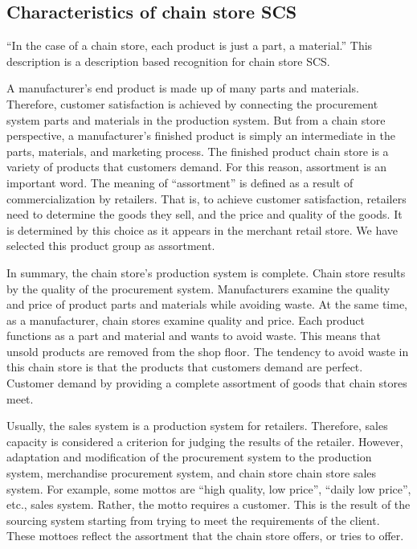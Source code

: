 \documentclass[12pt,]{article}
\begin{document}
\hypertarget{characteristics-of-chain-store-scs}{%
\subsection{Characteristics of chain store
SCS}\label{characteristics-of-chain-store-scs}}

``In the case of a chain store, each product is just a part, a
material.'' This description is a description based recognition for
chain store SCS.

A manufacturer's end product is made up of many parts and materials.
Therefore, customer satisfaction is achieved by connecting the
procurement system parts and materials in the production system. But
from a chain store perspective, a manufacturer's finished product is
simply an intermediate in the parts, materials, and marketing process.
The finished product chain store is a variety of products that customers
demand. For this reason, assortment is an important word. The meaning of
``assortment'' is defined as a result of commercialization by retailers.
That is, to achieve customer satisfaction, retailers need to determine
the goods they sell, and the price and quality of the goods. It is
determined by this choice as it appears in the merchant retail store. We
have selected this product group as assortment.

In summary, the chain store's production system is complete. Chain store
results by the quality of the procurement system. Manufacturers examine
the quality and price of product parts and materials while avoiding
waste. At the same time, as a manufacturer, chain stores examine quality
and price. Each product functions as a part and material and wants to
avoid waste. This means that unsold products are removed from the shop
floor. The tendency to avoid waste in this chain store is that the
products that customers demand are perfect. Customer demand by providing
a complete assortment of goods that chain stores meet.

Usually, the sales system is a production system for retailers.
Therefore, sales capacity is considered a criterion for judging the
results of the retailer. However, adaptation and modification of the
procurement system to the production system, merchandise procurement
system, and chain store chain store sales system. For example, some
mottos are ``high quality, low price'', ``daily low price'', etc., sales
system. Rather, the motto requires a customer. This is the result of the
sourcing system starting from trying to meet the requirements of the
client. These mottoes reflect the assortment that the chain store
offers, or tries to offer.
\end{document}
